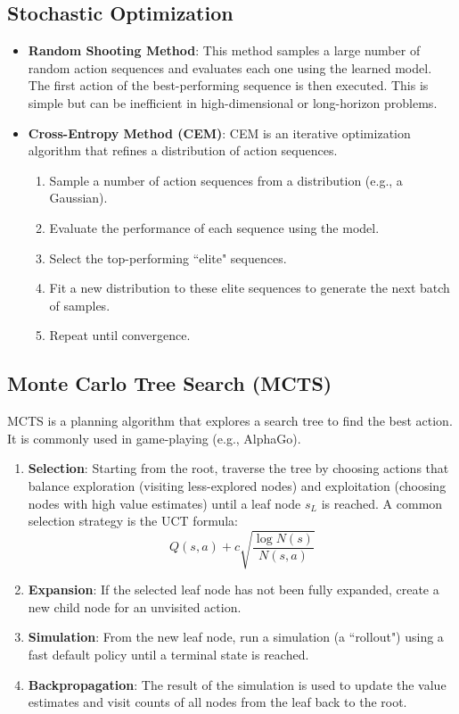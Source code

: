 \documentclass[12pt]{article}
\begin{document}
\subsection{Stochastic Optimization}
\begin{itemize}
    \item \textbf{Random Shooting Method}: This method samples a large number of random action sequences and evaluates each one using the learned model. The first action of the best-performing sequence is then executed. This is simple but can be inefficient in high-dimensional or long-horizon problems.
    \item \textbf{Cross-Entropy Method (CEM)}: CEM is an iterative optimization algorithm that refines a distribution of action sequences.
    \begin{enumerate}
        \item Sample a number of action sequences from a distribution (e.g., a Gaussian).
        \item Evaluate the performance of each sequence using the model.
        \item Select the top-performing ``elite" sequences.
        \item Fit a new distribution to these elite sequences to generate the next batch of samples.
        \item Repeat until convergence.
    \end{enumerate}
\end{itemize}

\subsection{Monte Carlo Tree Search (MCTS)}
MCTS is a planning algorithm that explores a search tree to find the best action. It is commonly used in game-playing (e.g., AlphaGo).
\begin{enumerate}
    \item \textbf{Selection}: Starting from the root, traverse the tree by choosing actions that balance exploration (visiting less-explored nodes) and exploitation (choosing nodes with high value estimates) until a leaf node $s_L$ is reached. A common selection strategy is the UCT formula:
    $$ Q(s, a) + c \sqrt{\frac{\log N(s)}{N(s, a)}} $$
    \item \textbf{Expansion}: If the selected leaf node has not been fully expanded, create a new child node for an unvisited action.
    \item \textbf{Simulation}: From the new leaf node, run a simulation (a ``rollout") using a fast default policy until a terminal state is reached.
    \item \textbf{Backpropagation}: The result of the simulation is used to update the value estimates and visit counts of all nodes from the leaf back to the root.
\end{enumerate}
\end{document}
